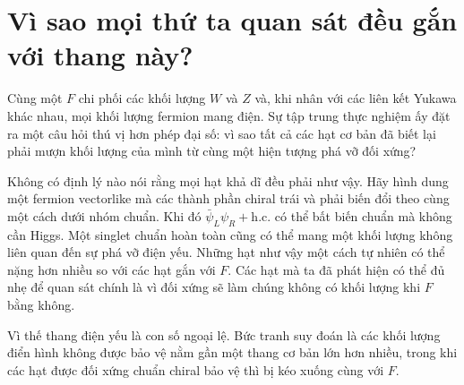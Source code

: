 \section{Vì sao mọi thứ ta quan sát đều gắn với thang này?}

Cùng một \(F\) chi phối các khối lượng \(W\) và \(Z\) và, khi nhân với các liên kết Yukawa khác nhau, mọi khối lượng fermion mang điện. Sự tập trung thực nghiệm ấy đặt ra một câu hỏi thú vị hơn phép đại số: vì sao tất cả các hạt cơ bản đã biết lại phải mượn khối lượng của mình từ cùng một hiện tượng phá vỡ đối xứng?

Không có định lý nào nói rằng mọi hạt khả dĩ đều phải như vậy. Hãy hình dung một fermion vectorlike mà các thành phần chiral trái và phải biến đổi theo cùng một cách dưới nhóm chuẩn. Khi đó
\(\bar\psi_L\psi_R+\mathrm{h.c.}\) có thể bất biến chuẩn mà không cần Higgs.
Một singlet chuẩn hoàn toàn cũng có thể mang một khối lượng không liên quan đến sự phá vỡ điện yếu. Những hạt như vậy một cách tự nhiên có thể nặng hơn nhiều so với các hạt gắn với \(F\). Các hạt mà ta đã phát hiện có thể đủ nhẹ để quan sát chính là vì đối xứng sẽ làm chúng không có khối lượng khi \(F\) bằng không.

Vì thế thang điện yếu là con số ngoại lệ. Bức tranh suy đoán là các khối lượng điển hình không được bảo vệ nằm gần một thang cơ bản lớn hơn nhiều, trong khi các hạt được đối xứng chuẩn chiral bảo vệ thì bị kéo xuống cùng với \(F\).

\begin{classroomqa}
\end{classroomqa}

\begin{classroomqa}
\end{classroomqa}

